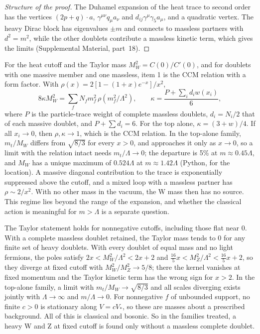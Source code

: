 \documentclass[aps,prd,reprint,onecolumn,nofootinbib,amsmath,amssymb,floatfix]{revtex4-2}
\theoremstyle{plain}
\newcommand{\supp}[1]{Supplemental Material, part~#1}
\begin{document}
\begin{proof}[Structure of the proof]
The Duhamel expansion of the heat trace to second order has the vertices $(2p+q)\cdot a$, $\gamma^{\mu\nu}q_\mu a_\nu$ and $d_{ij}\gamma^\mu\gamma_5a_\mu$, and a quadratic vertex. The heavy Dirac block has eigenvalues $\pm m$ and connects to massless partners with $d^2=m^2$, while the other doublets contribute a massless kinetic term, which gives the limits (\supp{18}).
\end{proof}

For the heat cutoff and the Taylor mass $M_W^2=C(0)/C'(0)$, and for doublets with one massive member and one massless, item 1 is the CCM relation with a form factor. With $\rho(x)=2[1-(1+x)e^{-x}]/x^2$,
\begin{equation}
8\kappa M_W^2=\sum_fN_fm_f^2\,\rho(m_f^2/\Lambda^2),\qquad \kappa=\frac{P+\sum_id_iw(x_i)}{6},
\end{equation}
where $P$ is the particle-trace weight of complete massless doublets, $d_i=N_i/2$ that of each massive doublet, and $P+\sum d_i=6$. For the top alone, $\kappa=(3+w)/4$. If all $x_i\to0$, then $\rho,\kappa\to1$, which is the CCM relation. In the top-alone family, $m_t/M_W$ differs from $\sqrt{8/3}$ for every $x>0$, and approaches it only as $x\to0$, so a limit with the relation intact needs $m_t/\Lambda\to0$; the departure is 5\% at $m\approx0.45\Lambda$, and $M_W$ has a unique maximum of $0.524\Lambda$ at $m\approx1.42\Lambda$ (Python, for the location). A massive diagonal contribution to the trace is exponentially suppressed above the cutoff, and a mixed loop with a massless partner has $\rho\sim2/x^2$. With no other mass in the vacuum, the W mass then has no source. This regime lies beyond the range of the expansion, and whether the classical action is meaningful for $m>\Lambda$ is a separate question.

The Taylor statement holds for nonnegative cutoffs, including those flat near $0$. With a complete massless doublet retained, the Taylor mass tends to $0$ for any finite set of heavy doublets. With every doublet of equal mass and no light fermions, the poles satisfy $2x<M_W^2/\Lambda^2<2x+2$ and $\tfrac{16}{5}x<M_Z^2/\Lambda^2<\tfrac{16}{5}x+2$, so they diverge at fixed cutoff with $M_W^2/M_Z^2\to5/8$; there the kernel vanishes at fixed momentum and the Taylor kinetic term has the wrong sign for $x>2$. In the top-alone family, a limit with $m_t/M_W\to\sqrt{8/3}$ and all scales diverging exists jointly with $\Lambda\to\infty$ and $m/\Lambda\to0$. For nonnegative $f$ of unbounded support, no finite $c>0$ is stationary along $V=cV_*$, so these are masses about a prescribed background. All of this is classical and bosonic. So in the families treated, a heavy W and Z at fixed cutoff is found only without a massless complete doublet.
\end{document}
